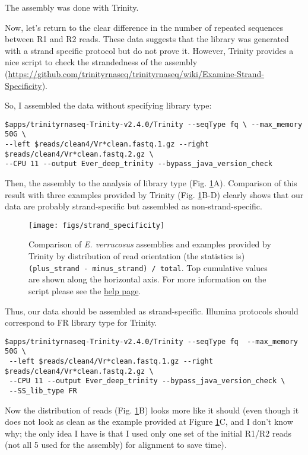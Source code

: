 \documentclass[12pt]{article}
\begin{document}
The assembly was done with Trinity. %
	
Now, let's return to the clear difference in the number of repeated sequences between R1 and R2 reads. These data suggests that the library was generated with a strand specific protocol but do not prove it. However, Trinity provides a nice script to check the strandedness of the assembly (\url{https://github.com/trinityrnaseq/trinityrnaseq/wiki/Examine-Strand-Specificity}).

So, I assembled the data without specifying library type:

\begin{verbatim}
$apps/trinityrnaseq-Trinity-v2.4.0/Trinity --seqType fq \ --max_memory 50G \
--left $reads/clean4/Vr*clean.fastq.1.gz --right $reads/clean4/Vr*clean.fastq.2.gz \
--CPU 11 --output Ever_deep_trinity --bypass_java_version_check
\end{verbatim}

 Then, the assembly to the analysis of library type (Fig. \ref{strand_specificity}A). Comparison of this result with three examples provided by Trinity (Fig. \ref{strand_specificity}B-D) clearly shows that our data are probably strand-specific but assembled as non-strand-specific.

\begin{figure}[H]
\texttt{[image: figs/strand\_specificity]}
\caption{Comparison of \textit{E. verrucosus} assemblies and examples  provided by Trinity by distribution of read orientation (the statistics is) \texttt{(plus\_strand - minus\_strand) / total}. Top cumulative values are shown along the horizontal axis. For more information on the script please see the \href{https://github.com/trinityrnaseq/trinityrnaseq/wiki/Examine-Strand-Specificity}{help page}. }
\label{strand_specificity}
\end{figure}

Thus, our data should be assembled as strand-specific. Illumina protocols should correspond to FR library type for Trinity.

\begin{verbatim}
$apps/trinityrnaseq-Trinity-v2.4.0/Trinity --seqType fq  --max_memory 50G \
 --left $reads/clean4/Vr*clean.fastq.1.gz --right $reads/clean4/Vr*clean.fastq.2.gz \
 --CPU 11 --output Ever_deep_trinity --bypass_java_version_check \
 --SS_lib_type FR
\end{verbatim}

Now the distribution of reads (Fig. \ref{strand_specificity}B) looks more like it should (even though it does not look as clean as the example provided at Figure \ref{strand_specificity}C, and I don't know why; the only idea I have is that I used only one set of the initial R1/R2 reads (not all 5 used for the assembly) for alignment to save time). 
\end{document}

